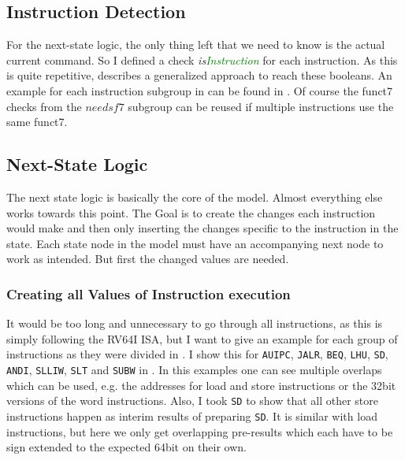 \subsection{Instruction Detection}

For the next-state logic, the only thing left that we need to know is
the actual current command. So I defined a check
\textsl{is\textcolor{Green}{Instruction}} for each instruction. As
this is quite repetitive,  describes a
generalized approach to reach these booleans. An example for each
instruction subgroup in  can be found
in . Of course the funct7 checks from
the $needsf7$ subgroup can be reused if multiple instructions use the
same funct7.




\subsection{Next-State Logic}
The next state logic is basically the core of the model. Almost
everything else works towards this point. The Goal is to create the
changes each instruction would make and then only inserting the
changes specific to the instruction in the state. Each state node in
the model must have an accompanying next node to work as intended.
But first the changed values are needed.

\subsubsection{Creating all Values of Instruction execution}
It would be too long and unnecessary to go through all instructions,
as this is simply following the RV64I ISA, but I want to give an
example for each group of instructions as they were divided in
. I show this for \texttt{AUIPC},
\texttt{JALR}, \texttt{BEQ}, \texttt{LHU}, \texttt{SD},
\texttt{ANDI}, \texttt{SLLIW}, \texttt{SLT} and \texttt{SUBW} in
. In this examples one can see multiple
overlaps which can be used, e.g. the addresses for load and store
instructions or the 32bit versions of the word instructions. Also, I
took \texttt{SD} to show that all other store instructions happen as
interim results of preparing \texttt{SD}. It is similar with load
instructions, but here we only get overlapping pre-results which each
have to be sign extended to the expected 64bit on their own.


